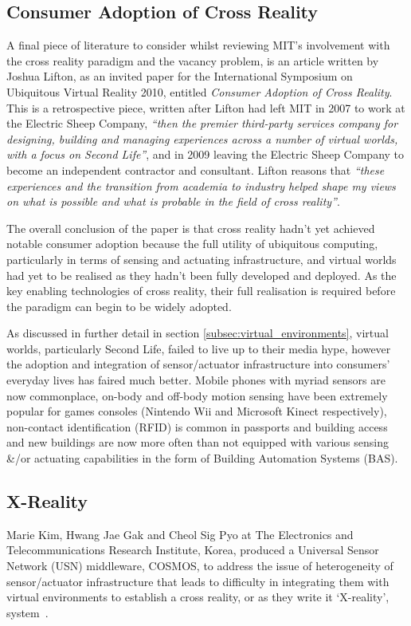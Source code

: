 \subsection{Consumer Adoption of Cross Reality}
\label{subsec:consumer_adoption_of_cross_reality}
A final piece of literature to consider whilst reviewing MIT's involvement with the cross reality paradigm and the vacancy problem, is an article written by Joshua Lifton, as an invited paper for the International Symposium on Ubiquitous Virtual Reality 2010, entitled \textit{Consumer Adoption of Cross Reality}. This is a retrospective piece, written after Lifton had left MIT in 2007 to work at the Electric Sheep Company, \textit{``then the premier third-party services company for designing, building and managing experiences across a number of virtual worlds, with a focus on Second Life''}, and in 2009 leaving the Electric Sheep Company to become an independent contractor and consultant. Lifton reasons that \textit{``these experiences and the transition from academia to industry helped shape my views on what is possible and what is probable in the field of cross reality''}.

The overall conclusion of the paper is that cross reality hadn't yet achieved notable consumer adoption because the full utility of ubiquitous computing, particularly in terms of sensing and actuating infrastructure, and virtual worlds had yet to be realised as they hadn't been fully developed and deployed. As the key enabling technologies of cross reality, their full realisation is required before the paradigm can begin to be widely adopted.

As discussed in further detail in section \ref{subsec:virtual_environments}, virtual worlds, particularly Second Life, failed to live up to their media hype, however the adoption and integration of sensor/actuator infrastructure into consumers' everyday lives has faired much better. Mobile phones with myriad sensors are now commonplace, on-body and off-body motion sensing have been extremely popular for games consoles (Nintendo Wii and Microsoft Kinect respectively), non-contact identification (RFID) is common in passports and building access and new buildings are now more often than not equipped with various sensing \&/or actuating capabilities in the form of Building Automation Systems (BAS).

\subsection{X-Reality}
\label{subsec:x-reality}
Marie Kim, Hwang Jae Gak and Cheol Sig Pyo at The Electronics and Telecommunications Research Institute, Korea, produced a Universal Sensor Network (USN) middleware, COSMOS, to address the issue of heterogeneity of sensor/actuator infrastructure that leads to difficulty in integrating them with virtual environments to establish a cross reality, or as they write it `X-reality', system~\cite{kim:practical}.

